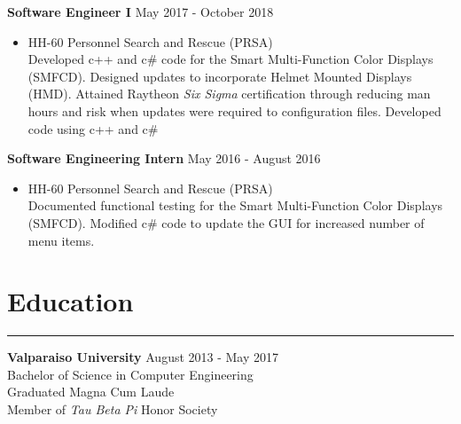 \documentclass[10pt, letterpaper]{article}
\begin{document}
\textbf{Software Engineer I} \hfill May 2017 - October 2018 \\
\vspace{-4ex}
\begin{itemize}[noitemsep]
    \item HH-60 Personnel Search and Rescue (PRSA) \\
    Developed c++ and c\# code for the Smart Multi-Function Color Displays (SMFCD). Designed updates to incorporate Helmet Mounted Displays (HMD). Attained Raytheon \emph{Six Sigma} certification through reducing man hours and risk when updates were required to configuration files.
    Developed code using c++ and c\#
\end{itemize}


\textbf{Software Engineering Intern} \hfill May 2016 - August 2016 \\
\vspace{-4ex}
\begin{itemize}[noitemsep]
    \item HH-60 Personnel Search and Rescue (PRSA) \\
    Documented functional testing for the Smart Multi-Function Color Displays (SMFCD). Modified c\# code to update the GUI for increased number of menu items.
\end{itemize}


\vspace{-2ex}
\section*{Education} \vspace{-2ex} \hrule
\vspace{1ex}

\textbf{Valparaiso University} \hfill August 2013 - May 2017 \\
\indent Bachelor of Science in Computer Engineering \\
\indent \indent Graduated Magna Cum Laude \\
\indent \indent Member of \emph{Tau Beta Pi} Honor Society
\end{document}
